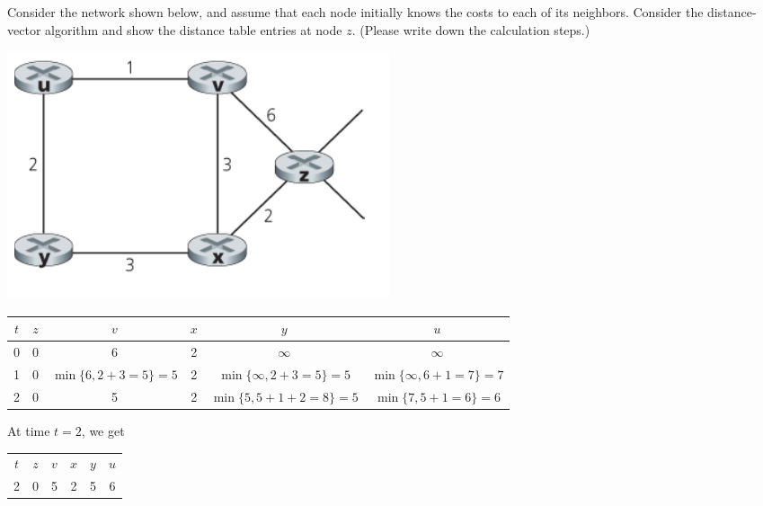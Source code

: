 \documentclass{report}
\begin{document}
\mktitle


\newpage
\begin{problem}
    Consider the network shown below, and assume that each node initially knows the costs to each of its neighbors. Consider the distance-vector algorithm and show the distance table entries at node $z$. (Please write down the calculation steps.)
    
    \begin{center}
    \includegraphics[scale=0.5]{figures/hw7-dv-algorithm.png}
    \end{center}
    
    \medskip
    \begin{answer}{40em}
        \begin{tabular}{c | c c c c c}
            \toprule
            $t$ & $z$ & $v$ & $x$ & $y$ & $u$ \\
            \midrule
            0 & 0 & 6 & 2 & $\infty$ & $\infty$ \\
            1 & 0 & $\min\{6, 2 + 3 = 5\} = 5$ & 2 & $\min\{\infty, 2 + 3 = 5\} = 5$ & $\min\{\infty, 6 + 1 = 7\} = 7$ \\
            2 & 0 & 5 & 2 & $\min\{5, 5 + 1 + 2 = 8\} = 5$ & $\min\{7, 5 + 1 = 6\} = 6$ \\
            \bottomrule
        \end{tabular}
        \newline
        At time $t = 2$, we get
        \newline
        \begin{tabular}{c | c c c c c}
            \toprule
            $t$ & $z$ & $v$ & $x$ & $y$ & $u$ \\
            2 & 0 & 5 & 2 & 5 & 6 \\
            \bottomrule
        \end{tabular}
 
    \end{answer}
\end{problem}
\end{document}
